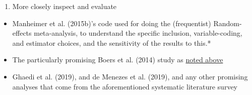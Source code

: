\documentclass[]{tufte-handout}
\providecommand{\tightlist}{%
  \setlength{\itemsep}{0pt}\setlength{\parskip}{0pt}}
\begin{document}
\hfill\break

\begin{enumerate}
\def\labelenumi{\arabic{enumi}.}
\setcounter{enumi}{3}
\tightlist
\item
  More closely inspect and evaluate
\end{enumerate}

\begin{itemize}
\tightlist
\item
  Manheimer et al. (2015b)'s code used for doing the (frequentist)
  Random-effects meta-analysis, to understand the specific inclusion,
  variable-coding, and estimator choices, and the sensitivity of the
  results to this.*
\end{itemize}


\begin{itemize}
\item
  The particularly promising Boers et al. (2014) study as
  \protect\hyperlink{boers}{noted above}
\item
  Ghaedi et al. (2019), and de Menezes et al. (2019), and any other
  promising analyses that come from the aforementioned systematic
  literature survey
\end{itemize}
\end{document}
